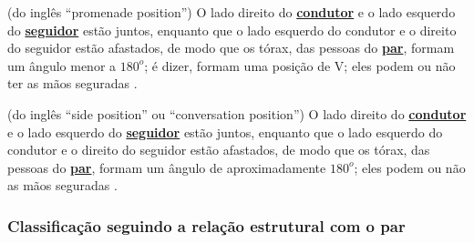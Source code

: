 \begin{definition}
\label{def:promenade-position}  (do inglês ``promenade position'') 
O lado direito do \hyperref[def:Condutor]{\textbf{condutor}} e o 
lado esquerdo do \hyperref[def:Seguidor]{\textbf{seguidor}} estão juntos,
enquanto que o lado esquerdo do condutor e o direito do seguidor estão afastados,
de modo que os tórax, das pessoas do \hyperref[def:Par]{\textbf{par}}, formam um ângulo menor a $180^o$;
é dizer, formam uma posição de V;
eles podem ou não ter as mãos seguradas \cite[pp. 13, 16]{BallroomDancing1992}.
\end{definition}


\begin{definition}
\label{def:lateral-position}  (do inglês ``side position'' ou ``conversation position'') 
O lado direito do \hyperref[def:Condutor]{\textbf{condutor}} e o 
lado esquerdo do \hyperref[def:Seguidor]{\textbf{seguidor}} estão juntos,
enquanto que o lado esquerdo do condutor e o direito do seguidor estão afastados,
de modo que os tórax, das pessoas do \hyperref[def:Par]{\textbf{par}}, formam um ângulo de aproximadamente $180^o$;
eles podem ou não as mãos seguradas \cite{fletsher2015improve} \cite[pp. 8]{harris1998social}.
\end{definition}


\subsubsection{Classificação seguindo a relação estrutural com o par}

